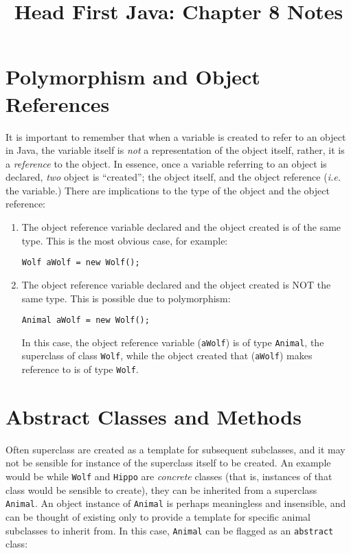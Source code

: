 \documentclass{tufte-handout}
\title{Head First Java: Chapter 8 Notes}
\begin{document}
    \maketitle

    \section*{Polymorphism and Object References}
    It is important to remember that when a variable is created to refer to an object in Java, the variable itself is \emph{not} a representation of the object itself, rather, it is a \emph{reference} to the object. In essence, once a variable referring to an object is declared, \emph{two} object is ``created''; the object itself, and the object reference (\textit{i.e.} the variable.) There are implications to the type of the object and the object reference:

    \begin{enumerate}
        \item The object reference variable declared and the object created is of the same type. This is the most obvious case, for example:

        \begin{lstlisting}
Wolf aWolf = new Wolf();
        \end{lstlisting}

        \item The object reference variable declared and the object created is NOT the same type. This is possible due to polymorphism:

        \begin{lstlisting}
Animal aWolf = new Wolf();
        \end{lstlisting}

        In this case, the object reference variable (\texttt{aWolf}) is of type \texttt{Animal}, the superclass of class \texttt{Wolf}, while the object created that (\texttt{aWolf}) makes reference to is of type \texttt{Wolf}. 
    \end{enumerate}

    \section*{Abstract Classes and Methods}
    Often superclass are created as a template for subsequent subclasses, and it may not be sensible for instance of the superclass itself to be created. An example would be while \texttt{Wolf} and \texttt{Hippo} are \emph{concrete} classes (that is, instances of that class would be sensible to create), they can be inherited from a superclass \texttt{Animal}. An object instance of \texttt{Animal} is perhaps meaningless and insensible, and can be thought of existing only to provide a template for specific animal subclasses to inherit from. In this case, \texttt{Animal} can be flagged as an \texttt{abstract} class:
\end{document}
